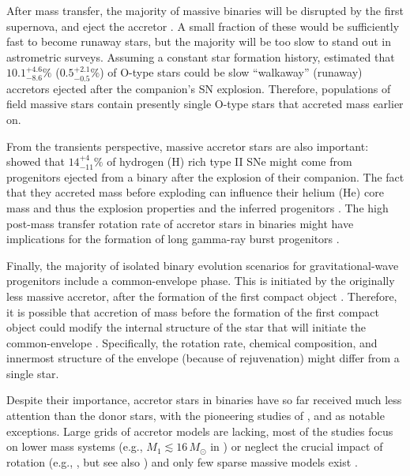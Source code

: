 \documentclass[twocolumn,twocolappendix,trackchanges]{aastex63}
\begin{document}
After mass transfer, the majority of massive binaries will be
disrupted by the first supernova, and eject the accretor \citep[``binary SN
scenario'', ][]{blaauw:61, dedonder:97, eldridge:11, boubert:18,
  renzo:19walk, evans:20}.  A small fraction of these would be
sufficiently fast to become runaway stars, but the majority will be
too slow to stand out in astrometric surveys. Assuming a constant star
formation history, \cite{renzo:19walk} estimated that
$10.1^{+4.6}_{-8.6}\%$ ($0.5^{+2.1}_{-0.5}\%$) of O-type stars could
be slow ``walkaway'' (runaway) accretors ejected after the companion's
SN explosion.  Therefore, populations of field massive stars contain
presently single O-type stars that accreted mass earlier on.

From the transients perspective, massive accretor stars are also
important: \cite{zapartas:19} showed that $14_{-11}^{+4}\%$ of
hydrogen (H) rich
type II SNe might come from progenitors ejected from a binary after
the explosion of their companion. The fact that they accreted mass before exploding can
influence their helium (He) core mass and thus the explosion
properties and the inferred progenitors \citep{zapartas:21}. %
The high post-mass transfer rotation
rate of accretor stars in binaries might have implications for the
formation of long gamma-ray burst progenitors \citep[e.g.,][]{cantiello:07}.

Finally, the majority of isolated binary evolution scenarios for
gravitational-wave progenitors include a common-envelope
phase. This is initiated by the originally less massive accretor,
after the formation of the first compact object
\citep[e.g.,][]{belczynski:16nat, tauris:17,
  broekgaarden:21}. Therefore, it is possible that accretion of mass
before the formation of the first compact object could modify the
internal structure of the star that will initiate the common-envelope
\citep[e.g.,][]{law-smith:20, klencki:21}. Specifically, the
rotation rate, chemical composition, and innermost structure of the
envelope (because of rejuvenation) might differ from a single star.

Despite their importance, accretor stars in binaries have so far
received much less attention than the donor stars, with the pioneering
studies of \cite{ulrich:76, hellings:83, hellings:84}, and
\cite{braun:95} as notable exceptions. Large grids of accretor models
are lacking, most of the studies focus on lower mass systems
(e.g., $M_1\lesssim 16\,M_\odot$ in \citealt{vanrensbergen:11}) or
neglect the crucial impact of rotation (e.g., \citealt{sravan:19}, but see also
\citealt{wang:20}) and only few sparse massive models exist
\citep[e.g.,][]{cantiello:07}.
\end{document}
